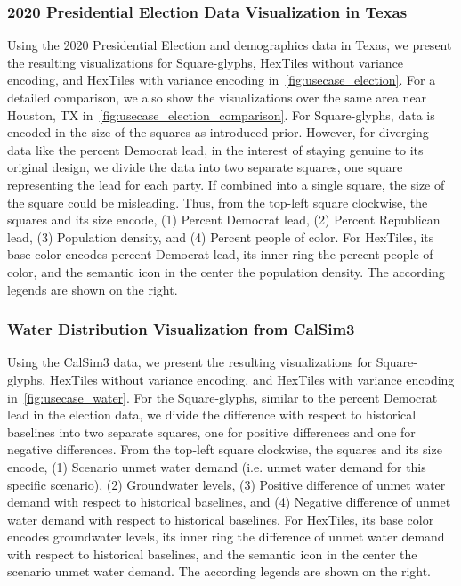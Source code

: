 \subsubsection{2020 Presidential Election Data Visualization in Texas}
\label{subsec:election_usecase}
Using the 2020 Presidential Election and demographics data in Texas, we present the resulting visualizations for Square-glyphs, HexTiles without variance encoding, and HexTiles with variance encoding in~\cref{fig:usecase_election}.
%
For a detailed comparison, we also show the visualizations over the same area near Houston, TX in~\cref{fig:usecase_election_comparison}.
% 
For Square-glyphs, data is encoded in the size of the squares as introduced prior. 
%
However, for diverging data like the percent Democrat lead, in the interest of staying genuine to its original design, we divide the data into two separate squares, one square representing the lead for each party.
%
If combined into a single square, the size of the square could be misleading.
%
Thus, from the top-left square clockwise, the squares and its size encode, (1) Percent Democrat lead, (2) Percent Republican lead, (3) Population density, and (4) Percent people of color.
%
For HexTiles, its base color encodes percent Democrat lead, its inner ring the percent people of color, and the semantic icon in the center the population density.
%
The according legends are shown on the right.

\subsubsection{Water Distribution Visualization from CalSim3}
\label{subsec:water_usecase}
Using the CalSim3 data, we present the resulting visualizations for Square-glyphs, HexTiles without variance encoding, and HexTiles with variance encoding in~\cref{fig:usecase_water}.
%
For the Square-glyphs, similar to the percent Democrat lead in the election data, we divide the difference with respect to historical baselines into two separate squares, one for positive differences and one for negative differences.
%
From the top-left square clockwise, the squares and its size encode, (1) Scenario unmet water demand (i.e. unmet water demand for this specific scenario), (2) Groundwater levels, (3) Positive difference of unmet water demand with respect to historical baselines, and (4) Negative difference of unmet water demand with respect to historical baselines.
%
For HexTiles, its base color encodes groundwater levels, its inner ring the difference of unmet water demand with respect to historical baselines, and the semantic icon in the center the scenario unmet water demand.
%
The according legends are shown on the right.


